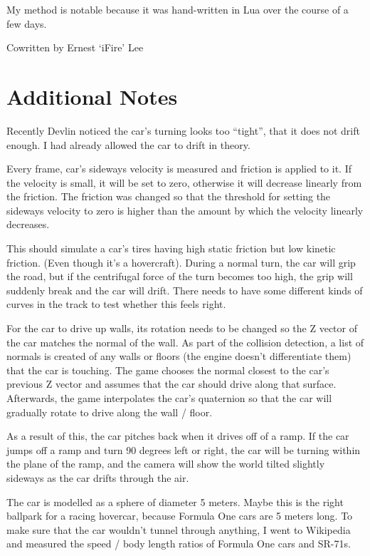 \documentclass[]{book}
\begin{document}
My method is notable because it was hand-written in Lua over the course
of a few days.

Cowritten by Ernest `iFire' Lee

\section{Additional Notes}\label{additional-notes}

Recently Devlin noticed the car's turning looks too ``tight'', that it
does not drift enough. I had already allowed the car to drift in theory.

Every frame, car's sideways velocity is measured and friction is applied
to it. If the velocity is small, it will be set to zero, otherwise it
will decrease linearly from the friction. The friction was changed so
that the threshold for setting the sideways velocity to zero is higher
than the amount by which the velocity linearly decreases.

This should simulate a car's tires having high static friction but low
kinetic friction. (Even though it's a hovercraft). During a normal turn,
the car will grip the road, but if the centrifugal force of the turn
becomes too high, the grip will suddenly break and the car will drift.
There needs to have some different kinds of curves in the track to test
whether this feels right.

For the car to drive up walls, its rotation needs to be changed so the Z
vector of the car matches the normal of the wall. As part of the
collision detection, a list of normals is created of any walls or floors
(the engine doesn't differentiate them) that the car is touching. The
game chooses the normal closest to the car's previous Z vector and
assumes that the car should drive along that surface. Afterwards, the
game interpolates the car's quaternion so that the car will gradually
rotate to drive along the wall / floor.

As a result of this, the car pitches back when it drives off of a ramp.
If the car jumps off a ramp and turn 90 degrees left or right, the car
will be turning within the plane of the ramp, and the camera will show
the world tilted slightly sideways as the car drifts through the air.

The car is modelled as a sphere of diameter 5 meters. Maybe this is the
right ballpark for a racing hovercar, because Formula One cars are 5
meters long. To make sure that the car wouldn't tunnel through anything,
I went to Wikipedia and measured the speed / body length ratios of
Formula One cars and SR-71s.
\end{document}
